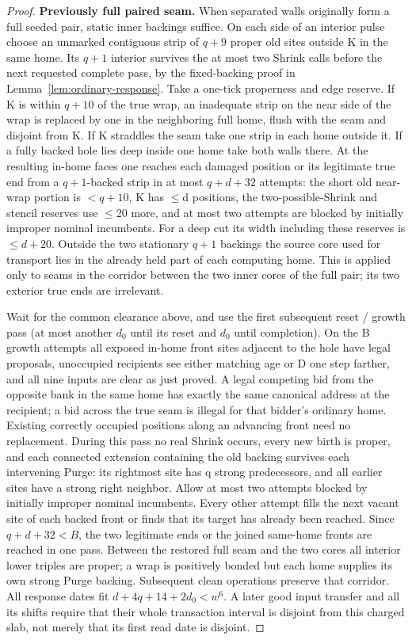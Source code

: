 \begin{proof}
\textbf{Previously full paired seam.} When separated walls originally form a full seeded pair, static inner backings suffice. On each side of an interior pulse choose an unmarked contiguous strip of \(q+9\) proper old sites outside K in the same home. Its \(q+1\) interior survives the at most two Shrink calls before the next requested complete pass, by the fixed-backing proof in Lemma~\ref{lem:ordinary-response}. Take a one-tick properness and edge reserve. If K is within \(q+10\) of the true wrap, an inadequate strip on the near side of the wrap is replaced by one in the neighboring full home, flush with the seam and disjoint from K. If K straddles the seam take one strip in each home outside it. If a fully backed hole lies deep inside one home take both walls there. At the resulting in-home faces one reaches each damaged position or its legitimate true end from a \(q+1\)-backed strip in at most \(q+d+32\) attempts: the short old near-wrap portion is \(<q+10\), K has \(\le\)d positions, the two-possible-Shrink and stencil reserves use \(\le\)20 more, and at most two attempts are blocked by initially improper nominal incumbents. For a deep cut its width including these reserves is \(\le\)\(d+20\). Outside the two stationary \(q+1\) backings the source core used for transport lies in the already held part of each computing home. This is applied only to seams in the corridor between the two inner cores of the full pair; its two exterior true ends are irrelevant.

Wait for the common clearance above, and use the first subsequent reset / growth pass (at most another \(d_0\) until its reset and \(d_0\) until completion). On the B growth attempts all exposed in-home front sites adjacent to the hole have legal proposals, unoccupied recipients see either matching age or D one step farther, and all nine inputs are clear as just proved. A legal competing bid from the opposite bank in the same home has exactly the same canonical address at the recipient; a bid across the true seam is illegal for that bidder's ordinary home. Existing correctly occupied positions along an advancing front need no replacement. During this pass no real Shrink occurs, every new birth is proper, and each connected extension containing the old backing survives each intervening Purge: its rightmost site has q strong predecessors, and all earlier sites have a strong right neighbor. Allow at most two attempts blocked by initially improper nominal incumbents. Every other attempt fills the next vacant site of each backed front or finds that its target has already been reached. Since \(q+d+32<B\), the two legitimate ends or the joined same-home fronts are reached in one pass. Between the restored full seam and the two cores all interior lower triples are proper; a wrap is positively bonded but each home supplies its own strong Purge backing. Subsequent clean operations preserve that corridor. All response dates fit \(d+4q+14+2d_0<w^6\). A later good input transfer and all its shifts require that their whole transaction interval is disjoint from this charged slab, not merely that its first read date is disjoint.


\end{proof}
